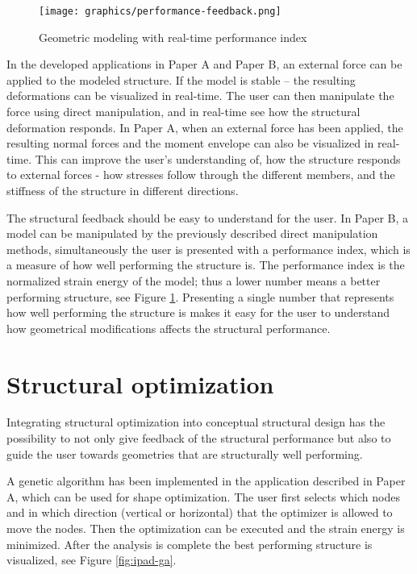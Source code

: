 \begin{figure}
  \texttt{[image: graphics/performance-feedback.png]}
  \caption{Geometric modeling with real-time performance index}
  \label{fig:performance-feedback}
\end{figure}

In the developed applications in Paper A and Paper B, an external force can be applied to the modeled structure. If the model is stable – the resulting deformations can be visualized in real-time. The user can then manipulate the force using direct manipulation, and in real-time see how the structural deformation responds. In Paper A, when an external force has been applied, the resulting normal forces and the moment envelope can also be visualized in real-time. This can improve the user’s understanding of, how the structure responds to external forces - how stresses follow through the different members, and the stiffness of the structure in different directions.

The structural feedback should be easy to understand for the user. In Paper B, a model can be manipulated by the previously described direct manipulation methods, simultaneously the user is presented with a performance index, which is a measure of how well performing the structure is. The performance index is the normalized strain energy of the model; thus a lower number means a better performing structure, see Figure \ref{fig:performance-feedback}. Presenting a single number that represents how well performing the structure is makes it easy for the user to understand how geometrical modifications affects the structural performance.


\section{Structural optimization}
Integrating structural optimization into conceptual structural design has the possibility to not only give feedback of the structural performance but also to guide the user towards geometries that are structurally well performing. 

A genetic algorithm has been implemented in the application described in Paper A, which can be used for shape optimization. The user first selects which nodes and in which direction (vertical or horizontal) that the optimizer is allowed to move the nodes. Then the optimization can be executed and the strain energy is minimized. After the analysis is complete the best performing structure is visualized, see Figure \ref{fig:ipad-ga}. 


